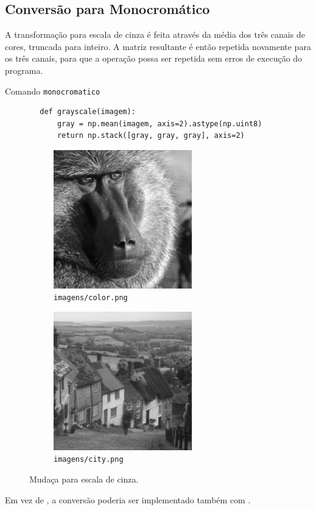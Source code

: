 \subsection{Conversão para Monocromático}

A transformação para escala de cinza é feita através da média dos três canais de cores, truncada para inteiro. A matriz resultante é então repetida novamente para os três canais, para que a operação possa ser repetida sem erros de execução do programa.

\begin{listing}[h]
    \caption{Comando \texttt{monocromatico}}

    \begin{verbatim}
        def grayscale(imagem):
            gray = np.mean(imagem, axis=2).astype(np.uint8)
            return np.stack([gray, gray, gray], axis=2)
    \end{verbatim}
\end{listing}

\begin{figure}
    \centering
    \begin{subfigure}{0.45\textwidth}
        \centering
        \includegraphics[width=6cm]{resultados/colormono.png}
        \caption{\texttt{imagens/color.png}}
    \end{subfigure}%
    \begin{subfigure}{0.45\textwidth}
        \centering
        \includegraphics[width=6cm]{resultados/citymono.png}
        \caption{\texttt{imagens/city.png}}
    \end{subfigure}

    \caption{Mudaça para escala de cinza.}
\end{figure}

Em vez de , a conversão poderia ser implementado também com  \autocite{ref:cvtcolor}.
